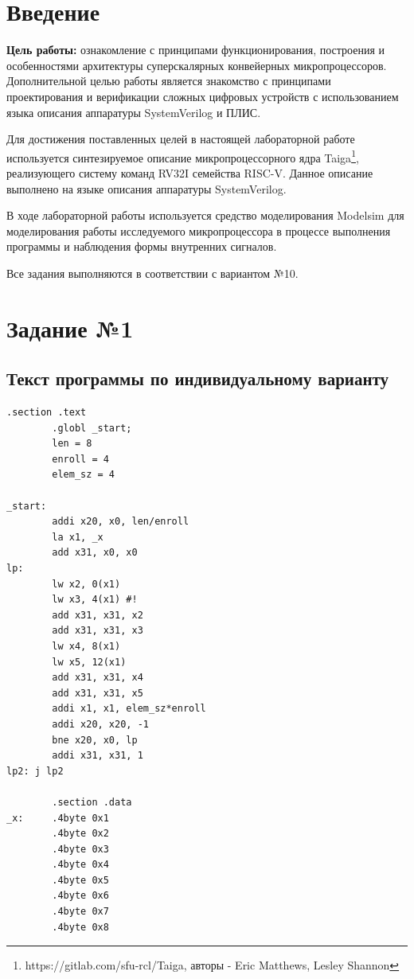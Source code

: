 \tableofcontents
\clearpage

\section*{Введение}

\textbf{Цель работы:} ознакомление с принципами функционирования, построения и особенностями архитектуры суперскалярных конвейерных микропроцессоров. Дополнительной целью работы является знакомство с принципами проектирования и верификации сложных цифровых устройств с использованием языка описания аппаратуры SystemVerilog и ПЛИС.

Для достижения поставленных целей в настоящей лабораторной работе
используется синтезируемое описание микропроцессорного ядра
Taiga\footnote{https://gitlab.com/sfu-rcl/Taiga, авторы - Eric Matthews,  Lesley Shannon},
реализующего систему команд RV32I семейства RISC-V. Данное описание выполнено на языке описания аппаратуры SystemVerilog.

В ходе лабораторной работы используется средство моделирования Modelsim для моделирования работы исследуемого микропроцессора в процессе выполнения программы и наблюдения формы внутренних сигналов.

Все задания выполняются в соответствии с вариантом №10.

\section{Задание №1}
\subsection{Текст программы по индивидуальному варианту}

\begin{lstlisting}[label=programText,caption=Текст программы по индивидуальному варианту]
        .section .text
		.globl _start;
		len = 8
		enroll = 4
		elem_sz = 4

_start:
		addi x20, x0, len/enroll
		la x1, _x
		add x31, x0, x0
lp:
		lw x2, 0(x1)
		lw x3, 4(x1) #!
		add x31, x31, x2
		add x31, x31, x3
		lw x4, 8(x1)
		lw x5, 12(x1)
		add x31, x31, x4
		add x31, x31, x5
		addi x1, x1, elem_sz*enroll
		addi x20, x20, -1
		bne x20, x0, lp
		addi x31, x31, 1
lp2: j lp2

		.section .data
_x:     .4byte 0x1
		.4byte 0x2
		.4byte 0x3
		.4byte 0x4
		.4byte 0x5
		.4byte 0x6
		.4byte 0x7
		.4byte 0x8
\end{lstlisting}

